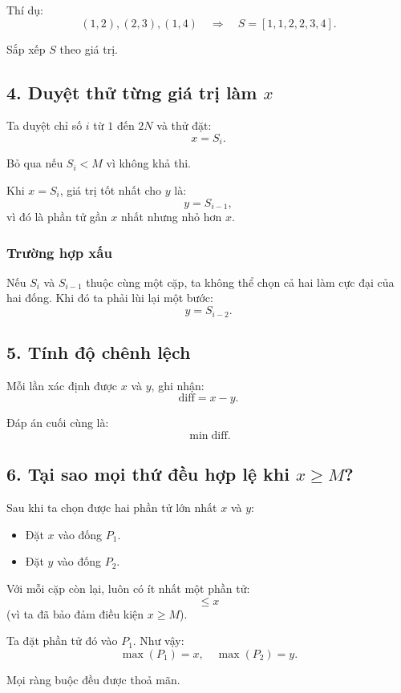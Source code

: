 Thí dụ:
\[
(1,2), (2,3), (1,4) 
\quad \Rightarrow \quad
S = [1,1,2,2,3,4].
\]

Sắp xếp $S$ theo giá trị.

\subsection*{4. Duyệt thử từng giá trị làm $x$}

Ta duyệt chỉ số $i$ từ $1$ đến $2N$ và thử đặt:
\[
x = S_i.
\]

Bỏ qua nếu $S_i < M$ vì không khả thi.

Khi $x = S_i$, giá trị tốt nhất cho $y$ là:
\[
y = S_{i-1},
\]
vì đó là phần tử gần $x$ nhất nhưng nhỏ hơn $x$.

\subsubsection*{Trường hợp xấu}

Nếu $S_{i}$ và $S_{i-1}$ thuộc cùng một cặp, ta không thể chọn cả hai làm cực đại của hai đống.  
Khi đó ta phải lùi lại một bước:
\[
y = S_{i-2}.
\]

\subsection*{5. Tính độ chênh lệch}

Mỗi lần xác định được $x$ và $y$, ghi nhận:
\[
\text{diff} = x - y.
\]

Đáp án cuối cùng là:
\[
\min \text{diff}.
\]

\subsection*{6. Tại sao mọi thứ đều hợp lệ khi $x \ge M$?}

Sau khi ta chọn được hai phần tử lớn nhất $x$ và $y$:

\begin{itemize}
    \item Đặt $x$ vào đống $P_1$.
    \item Đặt $y$ vào đống $P_2$.
\end{itemize}

Với mỗi cặp còn lại, luôn có ít nhất một phần tử:
\[
\le x
\]
(vì ta đã bảo đảm điều kiện $x \ge M$).

Ta đặt phần tử đó vào $P_1$.  
Như vậy:
\[
\max(P_1) = x, \quad \max(P_2) = y.
\]

Mọi ràng buộc đều được thoả mãn.

